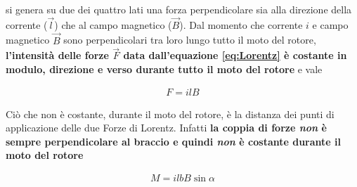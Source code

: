 \documentclass[17pt]{extarticle}
\begin{document}
si genera su due dei quattro lati una forza perpendicolare sia alla direzione della corrente ($\vec{l}$) che al campo magnetico ($\vec{B}$). Dal momento che corrente $i$ e campo magnetico $\vec{B}$ sono perpendicolari tra loro lungo tutto il moto del rotore, {\bf l'intensità delle forze $\vec{F}$ data dall'equazione \ref{eq:Lorentz} è costante in modulo, direzione e verso durante tutto il moto del rotore} e vale

\begin{eqnarray}
	F = ilB
\end{eqnarray}

Ciò che non è costante, durante il moto del rotore, è la distanza dei punti di applicazione delle due Forze di Lorentz. Infatti
{\bf la coppia di forze \emph{non} è sempre perpendicolare al braccio e quindi \emph{non} è costante durante il moto del rotore}

\begin{eqnarray}\label{eq:coppiaMotoreDC}
	M = ilbB\sin\alpha 
\end{eqnarray}
\end{document}
